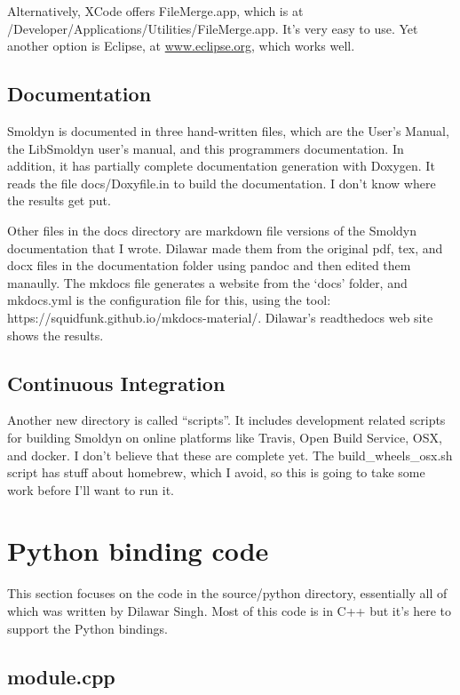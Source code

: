 \documentclass {book}
\begin{document}
Alternatively, XCode offers FileMerge.app, which is at /Developer/Applications/Utilities/FileMerge.app. It's very easy to use. Yet another option is Eclipse, at \url{www.eclipse.org}, which works well.

\section{Documentation}

Smoldyn is documented in three hand-written files, which are the User's Manual, the LibSmoldyn user's manual, and this programmers documentation. In addition, it has partially complete documentation generation with Doxygen. It reads the file docs/Doxyfile.in to build the documentation. I don't know where the results get put.

Other files in the docs directory are markdown file versions of the Smoldyn documentation that I wrote. Dilawar made them from the original pdf, tex, and docx files in the documentation folder using pandoc and then edited them manaully. The mkdocs file generates a website from the `docs' folder, and mkdocs.yml is the configuration file for this, using the tool: https://squidfunk.github.io/mkdocs-material/. Dilawar's readthedocs web site shows the results.

\section{Continuous Integration}

Another new directory is called ``scripts''. It includes development related scripts for building Smoldyn on online platforms like Travis, Open Build Service, OSX, and docker. I don't believe that these are complete yet. The build\_wheels\_osx.sh script has stuff about homebrew, which I avoid, so this is going to take some work before I'll want to run it.


\chapter{Python binding code}

This section focuses on the code in the source/python directory, essentially all of which was written by Dilawar Singh. Most of this code is in C++ but it's here to support the Python bindings.

\section{module.cpp}
\end{document}
